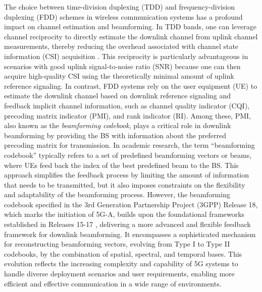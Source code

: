 \documentclass[lettersize,journal]{IEEEtran}
\begin{document}
The choice between time-division duplexing (TDD) and frequency-division duplexing (FDD) schemes in wireless communication systems has a profound impact on channel estimation and beamforming. In TDD bands, one can leverage channel reciprocity to directly estimate the downlink channel from uplink channel measurements, thereby reducing the overhead associated with channel state information (CSI) acquisition \cite{Marzetta2010TDD,TDD}. This reciprocity is particularly advantageous in scenarios with good uplink signal-to-noise ratio (SNR) because one can then acquire high-quality CSI using the theoretically minimal amount of uplink reference signaling. In contrast, FDD systems rely on the user equipment (UE) to estimate the downlink channel based on downlink reference signaling and feedback implicit channel information, such as channel quality indicator (CQI), precoding matrix indicator (PMI), and rank indicator (RI)\cite{choi2014FDD, FDD1}. Among these, PMI, also known as the \emph{beamforming codebook}, plays a critical role in downlink beamforming by providing the BS with information about the preferred precoding matrix for transmission\cite{FDD2}. In academic research, the term ``beamforming codebook'' typically refers to a set of predefined beamforming vectors or beams, where UEs feed back the index of the best predefined beam to the BS. This approach simplifies the feedback process by limiting the amount of information that needs to be transmitted, but it also imposes constraints on the flexibility and adaptability of the beamforming process\cite{DLovefeedback}. However, the beamforming codebook specified in the 3rd Generation Partnership Project (3GPP) Release 18, which marks the initiation of 5G-A\cite{5gA2}, builds upon the foundational frameworks established in Releases 15-17 \cite{Release15,Release16,Release17}, delivering a more advanced and flexible feedback framework for downlink beamforming. It encompasses a sophisticated mechanism for reconstructing beamforming vectors, evolving from Type I to Type II codebooks, by the combination of spatial, spectral, and temporal bases\cite{38.211,38.214}. This evolution reflects the increasing complexity and capability of 5G systems to handle diverse deployment scenarios and user requirements, enabling more efficient and effective communication in a wide range of environments.
\end{document}
